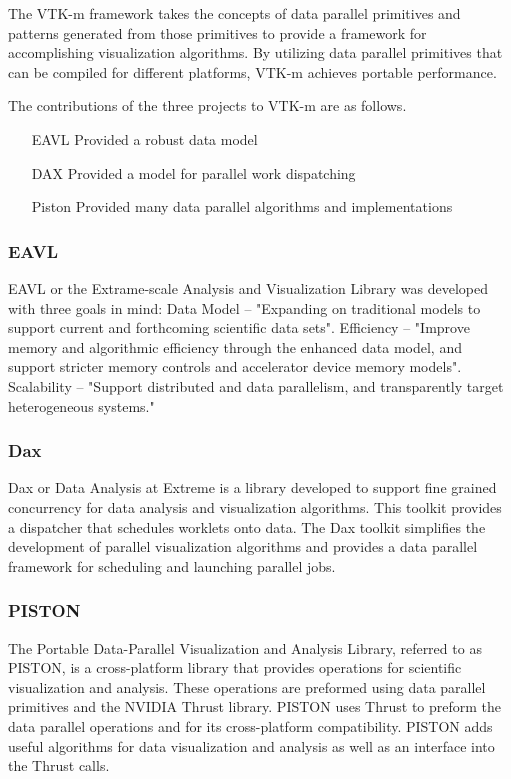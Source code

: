 The VTK-m framework takes the concepts of data parallel primitives and patterns generated from those primitives to provide a framework for accomplishing visualization algorithms.
%
By utilizing data parallel primitives that can be compiled for different platforms, VTK-m achieves portable performance.
% 
\cite{moreland2015vtk}
\cite{moreland2014vtk}

The contributions of the three projects to VTK-m are as follows.

\begin{itemize}
\item[EAVL] Provided a robust data model
\item[DAX] Provided a model for parallel work dispatching
\item[Piston] Provided many data parallel algorithms and implementations
\end{itemize}

\subsubsection*{\textbf{EAVL}}

EAVL or the Extrame-scale Analysis and Visualization Library was developed with three goals in mind: Data Model -- "Expanding on traditional models to support current and forthcoming scientific data sets". Efficiency -- "Improve memory and algorithmic efficiency through the enhanced data model, and support stricter memory controls and accelerator device memory models". Scalability -- "Support distributed and data parallelism, and transparently target heterogeneous systems."
~\cite{jeremyEAVL}

\subsubsection*{\textbf{Dax}}

Dax or Data Analysis at Extreme is a library developed to support fine grained concurrency for data analysis and visualization algorithms.
%
This toolkit provides a dispatcher that schedules worklets onto data.
%
The Dax toolkit simplifies the development of parallel visualization algorithms and provides a data parallel framework for scheduling and launching parallel jobs.
~\cite{morelanddax}
~\cite{moreland2011dax}

\subsubsection*{\textbf{PISTON}} 

The Portable Data-Parallel Visualization and Analysis Library, referred to as PISTON, is a cross-platform library that provides operations for scientific visualization and analysis.
%
These operations are preformed using data parallel primitives and the NVIDIA Thrust library.
%
PISTON uses Thrust to preform the data parallel operations and for its cross-platform compatibility.
%
PISTON adds useful algorithms for data visualization and analysis as well as an interface into the Thrust calls.
~\cite{PISTON}
